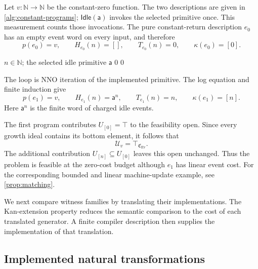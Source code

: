 \documentclass[11pt,a4paper]{article}
\numberwithin{algorithm}{section}
\numberwithin{equation}{section}
\theoremstyle{definition}
\theoremstyle{remark}
\theoremstyle{plain}
\newcommand{\N}{\mathbb N}
\newcommand{\Ev}{{\operatorname{Ev}}}
\newcommand{\Cplx}{\mathfrak C_{\Ev}}
\theoremstyle{definition}
\theoremstyle{plain}
\begin{document}
Let $v:\N\to\N$ be the constant-zero function. The two descriptions
are given in \cref{alg:constant-programs}; $\mathsf{Idle}(\mathsf a)$
invokes the selected primitive once. This measurement counts those
invocations. The pure constant-return description $e_0$ has an empty
event word on every input, and therefore
\[
 p(e_0)=v,\qquad H_{e_0}(n)=[],\qquad
 T_{e_0}(n)=0,\qquad\kappa(e_0)=[0].
\]
\begin{algorithm}[H]
\caption{Two implementations of the constant-zero function}\label{alg:constant-programs}
\small
\begin{algorithmic}[1]
\Require $n\in\N$; the selected idle primitive $\mathsf a$
  \State \Return $0$
\EndProcedure
{}
    \State {}
  \EndFor
  \State \Return $0$
\EndProcedure
\end{algorithmic}
\end{algorithm}
The loop is NNO iteration of the implemented primitive. The log
equation and finite induction give
\[
 p(e_1)=v,\qquad H_{e_1}(n)=\mathsf a^n,\qquad
 T_{e_1}(n)=n,\qquad\kappa(e_1)=[n].
\]
Here $\mathsf a^n$ is the finite word of charged idle events.

The first program contributes $U_{[0]}=\top$ to the feasibility
open.  Since every growth ideal contains its bottom element, it
follows that
\begin{equation}\label{eq:app-constant-open}
 \mathcal U_v=\top_{\Cplx}.
\end{equation}
The additional contribution $U_{[n]}\subseteq U_{[0]}$ leaves this
open unchanged. Thus the problem is feasible at the zero-cost budget
although $e_1$ has linear event cost. For the corresponding bounded
and linear machine-update example, see \cref{prop:matching}.

We next compare witness families by translating their implementations.
The Kan-extension property reduces the semantic comparison to the
cost of each translated generator. A finite compiler description
then supplies the implementation of that translation.

\subsection{Implemented natural transformations}
\end{document}
